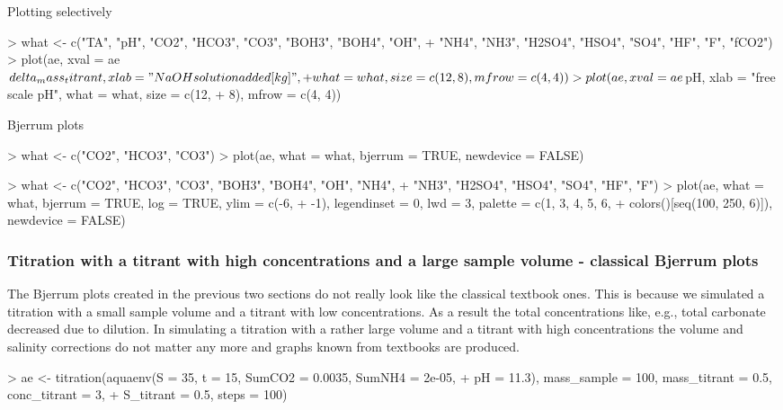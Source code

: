 \documentclass[article,nojss]{jss}
\begin{document}
Plotting selectively
\begin{Schunk}
\begin{Sinput}
> what <- c("TA", "pH", "CO2", "HCO3", "CO3", "BOH3", "BOH4", "OH", 
+     "NH4", "NH3", "H2SO4", "HSO4", "SO4", "HF", "F", "fCO2")
> plot(ae, xval = ae$delta_mass_titrant, xlab = "NaOH solution added [kg]", 
+     what = what, size = c(12, 8), mfrow = c(4, 4))
> plot(ae, xval = ae$pH, xlab = "free scale pH", what = what, size = c(12, 
+     8), mfrow = c(4, 4))
\end{Sinput}
\end{Schunk}

Bjerrum plots
\begin{Schunk}
\begin{Sinput}
> what <- c("CO2", "HCO3", "CO3")
> plot(ae, what = what, bjerrum = TRUE, newdevice = FALSE)
\end{Sinput}
\end{Schunk}

\begin{Schunk}
\begin{Sinput}
> what <- c("CO2", "HCO3", "CO3", "BOH3", "BOH4", "OH", "NH4", 
+     "NH3", "H2SO4", "HSO4", "SO4", "HF", "F")
> plot(ae, what = what, bjerrum = TRUE, log = TRUE, ylim = c(-6, 
+     -1), legendinset = 0, lwd = 3, palette = c(1, 3, 4, 5, 6, 
+     colors()[seq(100, 250, 6)]), newdevice = FALSE)
\end{Sinput}
\end{Schunk}


\subsubsection{Titration with a titrant with high concentrations and a large sample volume - classical Bjerrum plots}
The Bjerrum plots created in the previous two sections do not really look like the classical textbook ones.
This is because we simulated a titration with a small sample volume and a titrant with low concentrations. 
As a result the total concentrations like, e.g., total carbonate decreased due to dilution. 
In simulating a titration with a rather large volume and a titrant with high concentrations the volume and salinity corrections do not matter
any more and graphs known from textbooks \citep[e.g.][]{Zeebe2001} are produced.

\begin{Schunk}
\begin{Sinput}
> ae <- titration(aquaenv(S = 35, t = 15, SumCO2 = 0.0035, SumNH4 = 2e-05, 
+     pH = 11.3), mass_sample = 100, mass_titrant = 0.5, conc_titrant = 3, 
+     S_titrant = 0.5, steps = 100)
\end{Sinput}
\end{Schunk}
\end{document}
